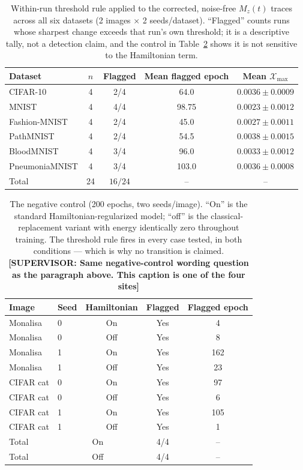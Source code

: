 \documentclass[11pt]{article}
\begin{document}
\begin{table}[H]
\centering
\caption{Within-run threshold rule applied to the corrected, noise-free $M_z(t)$ traces across all six datasets (2 images $\times$ 2 seeds/dataset). ``Flagged'' counts runs whose sharpest change exceeds that run's own threshold; it is a descriptive tally, not a detection claim, and the control in Table~\ref{tab:phase_transition_onoff} shows it is not sensitive to the Hamiltonian term.}
\label{tab:phase_transition_corrected}
\scriptsize
\begin{tabular}{lcccc}
\toprule
Dataset & $n$ & Flagged & Mean flagged epoch & Mean $\mathcal{X}_{\max}$ \\
\midrule
CIFAR-10 & 4 & 2/4 & 64.0 & $0.0036\pm0.0009$ \\
MNIST & 4 & 4/4 & 98.75 & $0.0023\pm0.0012$ \\
Fashion-MNIST & 4 & 2/4 & 45.0 & $0.0027\pm0.0011$ \\
PathMNIST & 4 & 2/4 & 54.5 & $0.0038\pm0.0015$ \\
BloodMNIST & 4 & 3/4 & 96.0 & $0.0033\pm0.0012$ \\
PneumoniaMNIST & 4 & 3/4 & 103.0 & $0.0036\pm0.0008$ \\
\midrule
Total & 24 & $16/24$ & -- & -- \\
\bottomrule
\end{tabular}
\end{table}

\begin{table}[H]
\centering
\caption{The negative control (200 epochs, two seeds/image). ``On'' is the standard Hamiltonian-regularized model; ``off'' is the classical-replacement variant with energy identically zero throughout training. The threshold rule fires in every case tested, in both conditions --- which is why no transition is claimed. {\color{red}\textbf{[SUPERVISOR: Same negative-control wording question as the paragraph above. This caption is one of the four sites]}}}
\label{tab:phase_transition_onoff}
\scriptsize
\begin{tabular}{llccc}
\toprule
Image & Seed & Hamiltonian & Flagged & Flagged epoch \\
\midrule
Monalisa & 0 & On & Yes & 4 \\
Monalisa & 0 & Off & Yes & 8 \\
Monalisa & 1 & On & Yes & 162 \\
Monalisa & 1 & Off & Yes & 23 \\
CIFAR cat & 0 & On & Yes & 97 \\
CIFAR cat & 0 & Off & Yes & 6 \\
CIFAR cat & 1 & On & Yes & 105 \\
CIFAR cat & 1 & Off & Yes & 1 \\
\midrule
Total & \multicolumn{2}{c}{On} & 4/4 & -- \\
Total & \multicolumn{2}{c}{Off} & 4/4 & -- \\
\bottomrule
\end{tabular}
\end{table}
\end{document}
